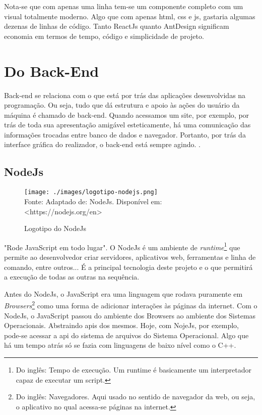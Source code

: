 Nota-se que com apenas uma linha tem-se um componente completo com
um visual totalmente moderno. Algo que com apenas
\acrshort{html},
\acrshort{css}
e
\acrshort{js},
gastaria algumas dezenas de linhas de código.
Tanto ReactJs quanto AntDesign significam economia
em termos de tempo, código e simplicidade de projeto.

\section{Do Back-End}

Back-end se relaciona com o que está por trás das aplicações desenvolvidas na programação. Ou seja, tudo que dá estrutura e apoio às ações do usuário da máquina é chamado de back-end. Quando acessamos um site, por exemplo, por trás de toda sua apresentação amigável esteticamente, há uma comunicação das informações trocadas entre banco de dados e navegador. Portanto, por trás da interface gráfica do realizador, o back-end está sempre agindo.
\cite{totvs-back-end}.

\subsection{NodeJs}

\begin{figure}[H]
    \centering
    \caption{Logotipo do NodeJs}
    \texttt{[image: ./images/logotipo-nodejs.png]}
    \label{fig:logotipo-nodejs} \\
    \textnormal{\fontsize{10pt}{12pt}Fonte: Adaptado de: NodeJs. Disponível em: <https://nodejs.org/en>}
\end{figure}

"Rode JavaScript em todo lugar".
O NodeJs é um ambiente de
\textit{runtime}\footnote{Do inglês: Tempo de execução. Um runtime é basicamente um interpretador
    capaz de executar um script.
}
que permite ao desenvolvedor criar servidores, aplicativos
\acrshort{web},
ferramentas e linha de comando, entre outros...
É a principal tecnologia deste projeto e o que permitirá
a execução de todas as outras na sequência.

Antes do NodeJs, o JavaScript era uma linguagem que
rodava puramente em
\textit{Browsers}\footnote{Do inglês: Navegadores. Aqui usado no sentido de
    navegador da \acrshort{web}, ou seja,
    o aplicativo no qual acessa-se páginas na internet.
}
como uma forma de adicionar interações às páginas da internet.
Com o NodeJs, o JavaScript passou do ambiente dos Browsers
ao ambiente dos Sistemas Operacionais. Abstraindo
\acrshort{api}s
dos mesmos. Hoje, com NojeJs, por exemplo, pode-se
acessar a
\acrshort{api}
do sistema de arquivos do Sistema Operacional.
Algo que há um tempo atrás só se fazia com
linguagens de baixo nível como o C++.

